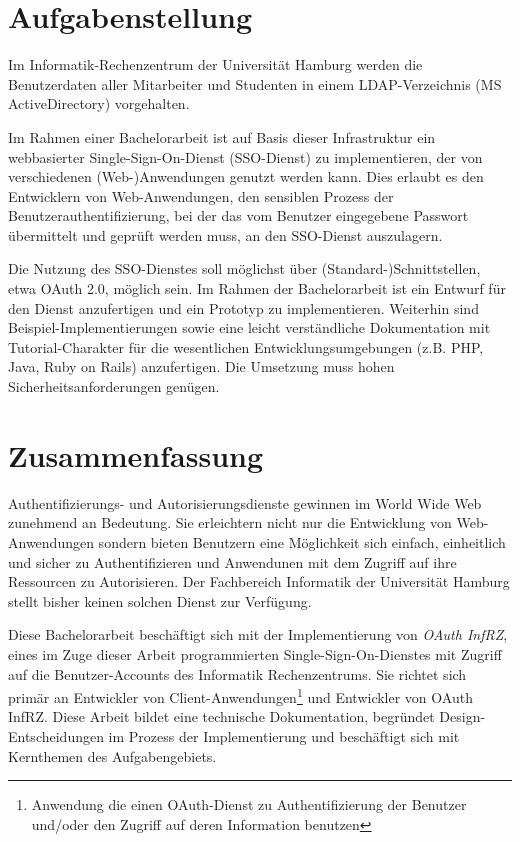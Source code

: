 \documentclass[12pt,a4paper,pointednumbers,abstracton]{scrartcl}
\newcommand{\changefont}[3]{
\fontfamily{#1} \fontseries{#2} \fontshape{#3} \selectfont}
\newcommand{\blankpage}{
\newpage
\thispagestyle{empty}
\null
\vfill
\begin{center}
	This page is intentionally left blank.
\end{center}
\newpage
}
\begin{document}
\normalsize
\changefont{ppl}{m}{n}
\newpage
\setcounter{page}{1}
\section*{Aufgabenstellung}

Im Informatik-Rechenzentrum der Universität Hamburg werden die Benutzerdaten aller Mitarbeiter und Studenten in einem LDAP-Verzeichnis (MS ActiveDirectory) vorgehalten.

Im Rahmen einer Bachelorarbeit ist auf Basis dieser Infrastruktur ein webbasierter Single-Sign-On-Dienst (SSO-Dienst) zu implementieren, der von verschiedenen \mbox{(Web-)Anwendungen} genutzt werden kann. Dies erlaubt es den Entwicklern von Web-Anwendungen, den sensiblen Prozess der Benutzerauthentifizierung, bei der das vom Benutzer eingegebene Passwort übermittelt und geprüft werden muss, an den SSO-Dienst auszulagern.

Die Nutzung des SSO-Dienstes soll möglichst über (Standard-)Schnittstellen, etwa OAuth 2.0, möglich sein. Im Rahmen der Bachelorarbeit ist ein Entwurf für den Dienst anzufertigen und ein Prototyp zu implementieren. Weiterhin sind Beispiel-Implementierungen sowie eine leicht verständliche Dokumentation mit Tutorial-Charakter für die wesentlichen Entwicklungsumgebungen (z.B. PHP, Java, Ruby on Rails) anzufertigen. Die Umsetzung muss hohen Sicherheitsanforderungen genügen.

\newpage
\section*{Zusammenfassung}

Authentifizierungs- und Autorisierungsdienste gewinnen im World Wide Web zunehmend an Bedeutung.
Sie erleichtern nicht nur die Entwicklung von Web-Anwendungen sondern bieten Benutzern eine Möglichkeit sich einfach, einheitlich und sicher zu Authentifizieren und Anwendunen mit dem Zugriff auf ihre Ressourcen zu Autorisieren.
Der Fachbereich Informatik der Universität Hamburg stellt bisher keinen solchen Dienst zur Verfügung.

Diese Bachelorarbeit beschäftigt sich mit der Implementierung von \emph{OAuth InfRZ}, eines im Zuge dieser Arbeit programmierten Single-Sign-On-Dienstes mit Zugriff auf die Benutzer-Accounts des Informatik Rechenzentrums.
Sie richtet sich primär an Entwickler von Client-Anwendungen\footnote{Anwendung die einen OAuth-Dienst zu Authentifizierung der Benutzer und/oder den Zugriff auf deren Information benutzen} und Entwickler von OAuth InfRZ.
Diese Arbeit bildet eine technische Dokumentation, begründet Design-Entscheidungen im Prozess der Implementierung und beschäftigt sich mit Kernthemen des Aufgabengebiets.
\end{document}
